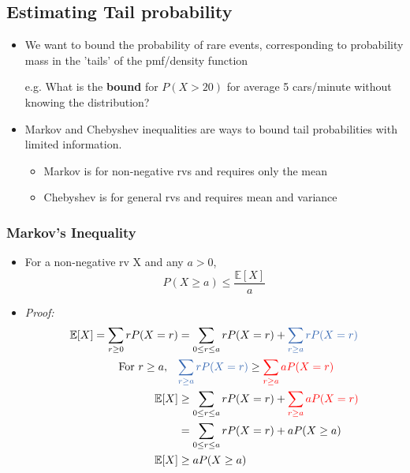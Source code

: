\documentclass[12pt]{article}
\begin{document}
\subsection{Estimating Tail probability}
\begin{itemize}
\item We want to bound the probability of rare events, corresponding to probability mass in the 'tails' of the pmf/density function
\begin{itemize}
e.g. What is the \textbf{bound} for $P(X>20)$ for average 5 cars/minute without knowing the distribution?
\end{itemize}
\item Markov and Chebyshev inequalities are ways to bound tail probabilities with limited information.
\begin{itemize}
\item Markov is for non-negative rvs and requires only the mean
\item Chebyshev is for general rvs and requires mean and variance
\end{itemize}
\end{itemize}

\subsubsection{Markov's Inequality}
\begin{itemize}
\item For a non-negative rv X and any $a > 0$,
$$ P(X \ge a) \le \frac{\mathbb{E}[X]}{a}$$ 
\item \textit{Proof:}
\begin{align*}
\mathbb{E}[X] = \sum_{r\ge0}rP(X=r) &= \sum_{0\le r\le a}rP(X=r) + \textcolor{blue1}{\sum_{r\ge a}rP(X=r)} \\
\textrm{For }r \ge a, \quad &\textcolor{blue1}{\sum_{r\ge a}rP(X=r)} \ge \textcolor{red}{\sum_{r\ge a}aP(X=r)} \\
\mathbb{E}[X] &\ge  \sum_{0\le r\le a}rP(X=r) + \textcolor{red}{\sum_{r\ge a}aP(X=r)} \\
&= \sum_{0\le r\le a}rP(X=r) + aP(X \ge a)\\
\mathbb{E}[X] &\ge  aP(X \ge a)
\end{align*}
\end{itemize}
\end{document}
